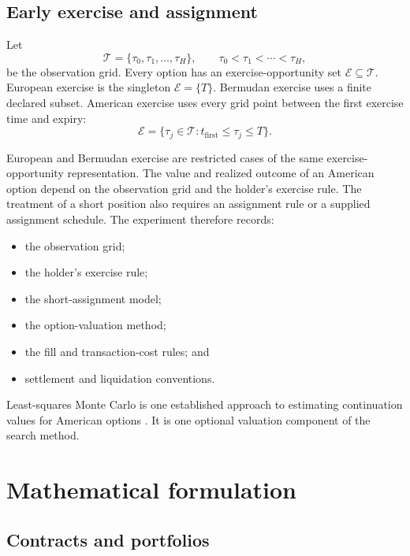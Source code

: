 \documentclass{strategynet-journal}
\begin{document}
\begin{SNcolumns}
\subsection{Early exercise and assignment}

Let
\[
  \mathcal T=\{\tau_0,\tau_1,\ldots,\tau_H\},
  \qquad \tau_0<\tau_1<\cdots<\tau_H,
\]
be the observation grid.  Every option has an exercise-opportunity set
\(\mathcal E\subseteq\mathcal T\).  European exercise is the singleton
\(\mathcal E=\{T\}\).  Bermudan exercise uses a finite declared subset.
American exercise uses every grid point between the first exercise time and
expiry:
\[
  \mathcal E
  =\{\tau_j\in\mathcal T:t_{\mathrm{first}}\leq\tau_j\leq T\}.
\]

European and Bermudan exercise are restricted cases of the same
exercise-opportunity representation.  The value and realized outcome of an
American option depend on the observation grid and the holder's exercise rule.
The treatment of a short position also requires an assignment rule or a
supplied assignment schedule.  The experiment therefore records:

\begin{itemize}
  \item the observation grid;
  \item the holder's exercise rule;
  \item the short-assignment model;
  \item the option-valuation method;
  \item the fill and transaction-cost rules; and
  \item settlement and liquidation conventions.
\end{itemize}

Least-squares Monte Carlo is one established approach to estimating
continuation values for American options \cite{longstaffschwartz}.  It is one
optional valuation component of the search method.

\end{SNcolumns}

\section{Mathematical formulation}
\label{sec:math}

\subsection{Contracts and portfolios}
\end{document}

